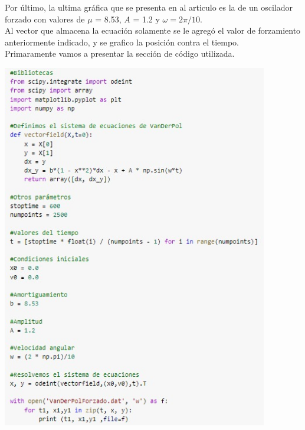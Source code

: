 \documentclass[12pt]{article}
\begin{document}
Por último, la ultima gráfica que se presenta en al articulo es la de un oscilador forzado con valores de $\mu$ = 8.53, $A$ = 1.2 y $\omega = 2\pi/ 10$. \\

Al vector que almacena la ecuación solamente se le agregó el valor de forzamiento anteriormente indicado, y se grafico la posición contra el tiempo.\\

Primaramente vamos a presentar la sección de código utilizada.
\begin{center}
    \includegraphics[height=16cm]{O7.jpeg}\\
\end{center}
\end{document}

